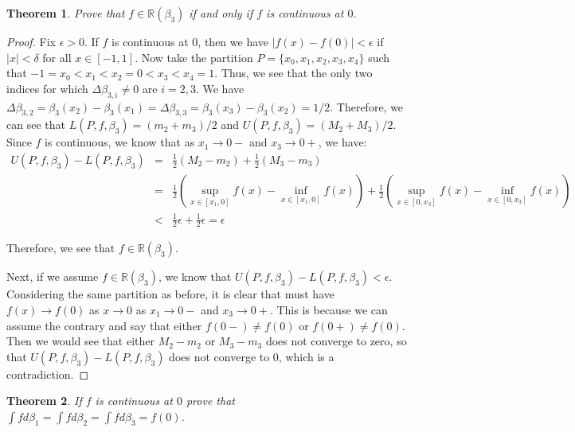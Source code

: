 \documentclass[psamsfonts]{amsart}
\newtheorem{thm}{Theorem}[section]
\theoremstyle{definition}
\theoremstyle{remark}
\numberwithin{equation}{section}
\begin{document}
\begin{thm}
Prove that $f \in \mathbb{R}(\beta_3)$ if and only if $f$ is continuous at $0$.
\end{thm}

\begin{proof}
Fix $\epsilon > 0$. If $f$ is continuous at $0$, then we have $|f(x) - f(0)| < \epsilon$ if $|x| < \delta$ for all $x \in [-1,1]$. Now take the partition $P = \{x_0, x_1, x_2, x_3, x_4 \}$ such that $-1 = x_0 < x_1 < x_2 = 0 < x_3 < x_4 = 1$. Thus, we see that the only two indices for which $\Delta \beta_{3,i} \neq 0$ are $i = 2,3$. We have $\Delta \beta_{3,2} = \beta_3(x_2) - \beta_3(x_1) = \Delta \beta_{3,3} = \beta_3(x_3) - \beta_3(x_2) = 1/2$. Therefore, we can see that $L(P,f,\beta_3) = (m_2 + m_3)/2$ and $U(P,f,\beta_3) = (M_2 + M_3) /2$. Since $f$ is continuous, we know that as $x_1 \to 0-$ and $x_3 \to 0+$, we have:
\begin{eqnarray}
U(P,f,\beta_3) - L(P,f,\beta_3) &=& \frac{1}{2} (M_2 - m_2)  + \frac{1}{2} ( M_3 - m_3) \\
&=& \frac{1}{2} \left(\sup_{x \in [x_1,0]} f(x) - \inf_{x \in [x_1,0]} f(x) \right) + \frac{1}{2} \left( \sup_{x \in [0,x_3]} f(x) - \inf_{x \in [0,x_3]} f(x) \right) \\
&<& \frac{1}{2} \epsilon + \frac{1}{2} \epsilon = \epsilon
\end{eqnarray}

Therefore, we see that $f \in \mathbb{R}(\beta_3)$. 

Next, if we assume $f \in \mathbb{R}(\beta_3)$, we know that $U(P,f,\beta_3) - L(P,f,\beta_3) < \epsilon$. Considering the same partition as before, it is clear that must have $f(x) \to f(0)$ as $x \to 0$ as $x_1 \to 0 -$ and $x_3 \to 0 +$. This is because we can assume the contrary and say that either $f(0-) \neq f(0)$ or $f(0+) \neq f(0)$. Then we would see that either $M_2 - m_2$ or $M_3 - m_3$ does not converge to zero, so that $U(P,f,\beta_3) - L(P,f,\beta_3)$ does not converge to 0, which is a contradiction. 
\end{proof}

\begin{thm}
If $f$ is continuous at $0$ prove that $\int f d \beta_1 = \int f d \beta_2 = \int f d \beta_3 = f(0)$. 
\end{thm}
\end{document}
